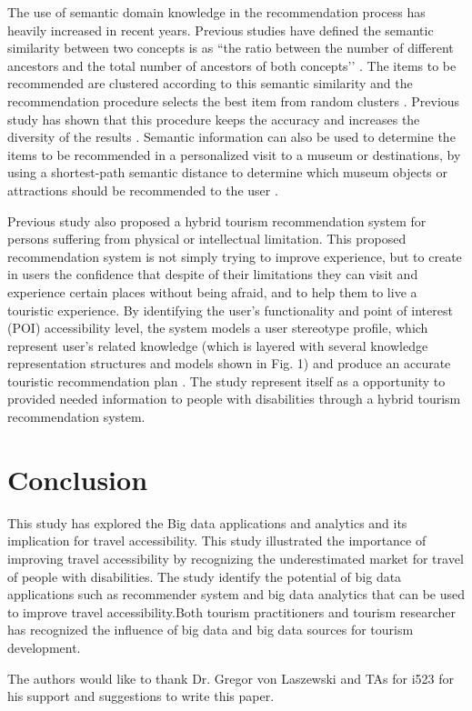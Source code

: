 The use of semantic domain knowledge in the recommendation process has heavily increased in recent years. Previous studies have defined the semantic similarity between two concepts is as ``the ratio between the number of different ancestors and the total number of ancestors of both concepts’’ \cite{morenorecommender}. The items to be recommended are clustered according to this semantic similarity and the recommendation procedure selects the best item from random clusters \cite{Santos2018}. Previous study has shown that this procedure keeps the accuracy and increases the diversity of the results \cite{morenorecommender}. Semantic information can also be used to determine the items to be recommended in a personalized visit to a museum or destinations, by using a shortest-path semantic distance to determine which museum objects or attractions should be recommended to the user \cite{morenorecommender}. 

Previous study also proposed a hybrid tourism recommendation system for persons suffering from physical or intellectual limitation. This proposed recommendation system is not simply trying to improve experience, but to create in users the confidence that despite of their limitations they can visit and experience certain places without being afraid, and to help them to live a touristic experience. By identifying the user’s functionality and point of interest (POI) accessibility level, the system models a user stereotype profile, which represent user’s related knowledge (which is layered with several knowledge representation structures and models shown in Fig. 1) and produce an accurate touristic recommendation plan \cite{Santos2018}. The study represent itself as a opportunity to provided needed information to people with disabilities through a hybrid tourism recommendation system. 



\section{Conclusion}

This study has explored the Big data applications and analytics and its implication  for travel accessibility. This study illustrated the importance of improving travel accessibility by recognizing the underestimated market for travel of people with disabilities. The study identify the potential of big data applications such as recommender system and big data analytics that can be used to improve travel accessibility.Both tourism practitioners and tourism researcher has recognized the
influence of big data and big data sources for tourism development. 


\begin{acks}

  The authors would like to thank Dr. Gregor von Laszewski and TAs for i523 for his
  support and suggestions to write this paper.

\end{acks}


 

\appendix
